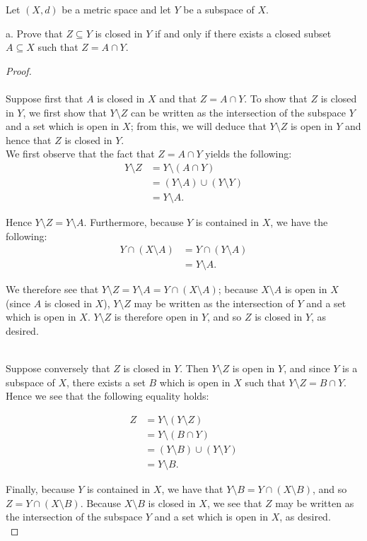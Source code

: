 Let $(X, d)$ be a metric space and let $Y$ be a subspace of $X$.

a.  Prove that $Z \subseteq Y$ is closed in $Y$ if and only if there exists a closed subset $A \subseteq X$ such that 
    $Z = A \cap Y$. 

\begin{proof}\ \\\\
    Suppose first that $A$ is closed in $X$ and that $Z = A \cap Y$. To show that $Z$ is closed in $Y$, we first show
    that $Y \setminus Z$ can be written as the intersection of the subspace $Y$ and a set which is open in $X$; from
    this, we will deduce that $Y \setminus Z$ is open in $Y$ and hence that $Z$ is closed in $Y$.
    \ \\
    
    We first observe that the fact that $Z = A \cap Y$ yields the following:
    \begin{align*}
        Y \setminus Z &= Y \setminus (A \cap Y) \\
                      &= (Y \setminus A) \cup (Y \setminus Y) \\
                      &= Y \setminus A.
    \end{align*}

    Hence $Y \setminus Z = Y \setminus A$. Furthermore, because $Y$ is contained in $X$, we have the following: 
    \begin{align*}
        Y \cap (X \setminus A) &= Y \cap (Y \setminus A) \\
                               &= Y \setminus A.
    \end{align*}

    We therefore see that $Y \setminus Z = Y \setminus A = Y \cap (X \setminus A)$; because $X \setminus A$ is open in 
    $X$ (since $A$ is closed in $X$), $Y \setminus Z$ may be written as the intersection of $Y$ and a set which is open
    in $X$. $Y \setminus Z$ is therefore open in $Y$, and so $Z$ is closed in $Y$, as desired.

    \ \\
    Suppose conversely that $Z$ is closed in $Y$. Then $Y \setminus Z$ is open in $Y$, and since $Y$ is a subspace of 
    $X$, there exists a set $B$ which is open in $X$ such that $Y \setminus Z = B \cap Y$. Hence we see that the 
    following equality holds:

    \begin{align*}
        Z &= Y \setminus (Y \setminus Z) \\
          &= Y \setminus (B \cap Y) \\
          &= (Y \setminus B) \cup (Y \setminus Y) \\
          &= Y \setminus B.
    \end{align*}

    Finally, because $Y$ is contained in $X$, we have that $Y \setminus B = Y \cap (X \setminus B)$, and so 
    $Z = Y \cap (X \setminus B)$. Because $X \setminus B$ is closed in $X$, we see that $Z$ may be written as the 
    intersection of the subspace $Y$ and a set which is open in $X$, as desired.
    \ \\
\end{proof}

